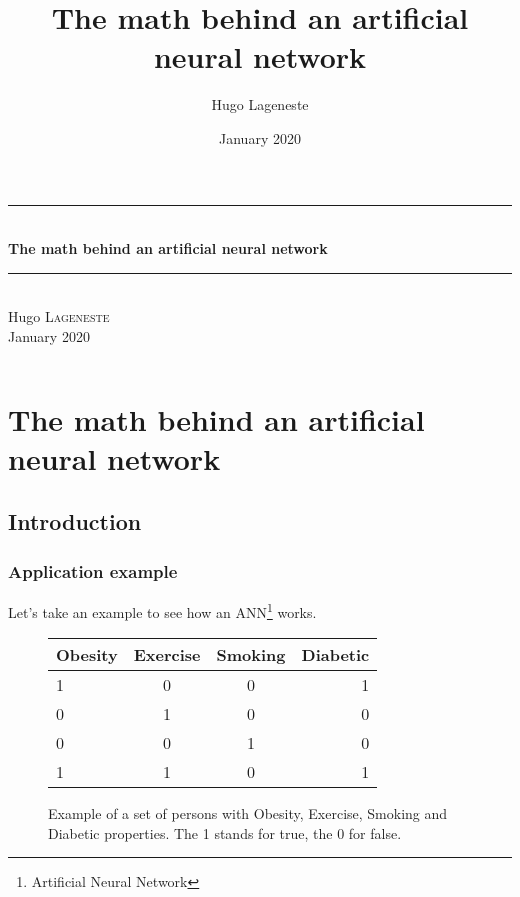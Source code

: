 \documentclass[]{report}
\title{The math behind an artificial neural network}
\author{Hugo Lageneste}
\date{January 2020}
\begin{document}
\begin{titlepage}
    \center

    \newcommand{\HRule}{\rule{\linewidth}{0.5mm}}
    \HRule \\[0.4cm]
    {\huge \bfseries The math behind an artificial neural network  }\\[0.1cm]
    \HRule \\[0.4cm]

    {Hugo \textsc{Lageneste}}\\[0.5cm]
    {\large January 2020}\\[2cm]

    \vfill
    \begin{neuralnetwork}[height=10, nodespacing=25mm, layerspacing=35mm, nodesize=30pt]
        \hiddenlayer[count=6, bias=false]
        \linklayers
        \hiddenlayer[count=6, bias=false]
        \linklayers
        \outputlayer[count=3]
        \linklayers
    \end{neuralnetwork}
    \vfill
\end{titlepage}

\begingroup
\let\cleardoublepage\relax
\let\clearpage\relax

\tableofcontents

\needspace{6cm}
\[\;\]

\vfill

\endgroup

\chapter*{The math behind an artificial neural network}

\setcounter{section}{-1}
\section{Introduction}
\label{sec:intro}

\subsection{Application example}

{Let's take an example to see how an ANN\footnote{Artificial Neural Network} works.}

\begin{figure}[H]
    \centering
    \begin{tabular}{|l|c|c|r|}
      \hline
      Obesity & Exercise & Smoking & Diabetic \\
      \hline
      1 & 0 & 0 & 1 \\
      0 & 1 & 0 & 0 \\
      0 & 0 & 1 & 0 \\
      1 & 1 & 0 & 1 \\
      \hline
    \end{tabular}
    \caption{Example of a set of persons with Obesity, Exercise, Smoking and Diabetic properties. The 1 stands for true, the 0 for false.}
\end{figure}
\end{document}
